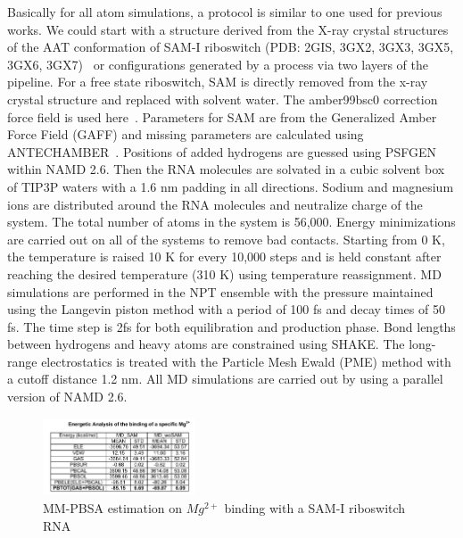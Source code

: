 \documentclass[a4paper,10pt]{article}
\newcommand{\up}{\vspace*{-1em}}
\begin{document}
Basically for all atom simulations, a protocol is similar to one used for previous works.  We could start with a structure derived from the X-ray crystal structures of the AAT conformation of SAM-I riboswitch (PDB: 2GIS, 3GX2, 3GX3, 3GX5, 3GX6, 3GX7)~\cite{montange} or configurations generated by a process via two layers of the pipeline. For a free state riboswitch, SAM is directly removed from the x-ray crystal structure and replaced with solvent water. The amber99bsc0 correction force field is used here~\cite{alberto}. Parameters for SAM are from the Generalized Amber Force Field (GAFF) and missing parameters are calculated using ANTECHAMBER~\cite{wang}. Positions of added hydrogens are guessed using PSFGEN within NAMD 2.6. Then the RNA molecules are solvated in a cubic solvent box of TIP3P waters with a 1.6 nm padding in all directions. Sodium and magnesium ions are distributed around the RNA molecules and neutralize charge of the system. The total number of atoms in the system is 56,000. Energy minimizations are carried out on all of the systems to remove bad contacts. Starting from 0 K, the temperature is raised 10 K for every 10,000 steps and is held constant after reaching the desired temperature (310 K) using temperature reassignment. MD simulations are performed in the NPT ensemble with the pressure maintained using the Langevin piston method with a period of 100 fs and decay times of 50 fs. The time step is 2fs for both equilibration and production phase. Bond lengths between hydrogens and heavy atoms are constrained using SHAKE. The long-range electrostatics is treated with the Particle Mesh Ewald (PME) method with a cutoff distance 1.2 nm.  All MD simulations are carried out by using a parallel version of NAMD 2.6.


\begin{figure}
  \includegraphics[width=0.4\textwidth]{mm-pbsa-mg}
   \caption{MM-PBSA estimation on ${Mg^{2+}}$ binding with a SAM-I riboswitch RNA}
\up\up
\label{fig:mm-pbsa-mg-table}
\end{figure}
\end{document}
